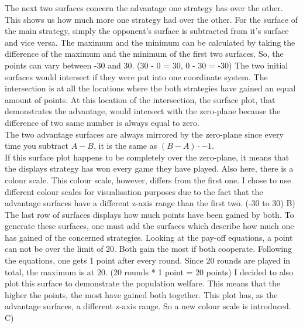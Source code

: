 \documentclass{article}
\begin{document}
The next two surfaces concern the advantage one strategy has over the other.
This shows us how much more one strategy had over the other.
For the surface of the main strategy, simply the opponent's surface is subtracted from it's surface and vice versa.
The maximum and the minimum can be calculated by taking the difference of the maximum and the minimum of the first two surfaces.
So, the points can vary between -30 and 30.
(30 - 0 = 30, 0 - 30 = -30)
The two initial surfaces would intersect if they were put into one coordinate system.
The intersection is at all the locations where the both strategies have gained an equal amount of points.
At this location of the intersection, the surface plot, that demonstrates the advantage, would intersect with the zero-plane because the difference of two same number is always equal to zero.\\
The two advantage surfaces are always mirrored by the zero-plane since every time you subtract $A-B$, it is the same as $(B-A) \cdot -1$.\\
If this surface plot happens to be completely over the zero-plane, it means that the displays strategy has won every game they have played.
Also here, there is a colour scale.
This colour scale, however, differs from the first one.
I chose to use different colour scales for visualisation purposes due to the fact that the advantage surfaces have a different z-axis range than the first two.
(-30 to 30)
B)
The last row of surfaces displays how much points have been gained by both.
To generate these surfaces, one must add the surfaces which describe how much one has gained of the concerned strategies.
Looking at the pay-off equations, a point can not be over the limit of 20.
Both gain the most if both cooperate.
Following the equations, one gets 1 point after every round.
Since 20 rounds are played in total, the maximum is at 20.
(20 rounds * 1 point = 20 points)
I decided to also plot this surface to demonstrate the population welfare.
This means that the higher the points, the most have gained both together.
This plot has, as the advantage surfaces, a different z-axis range.
So a new colour scale is introduced.
C)
\newpage


\newpage

\def \w {0.16}
\def \a {45}
\end{document}
